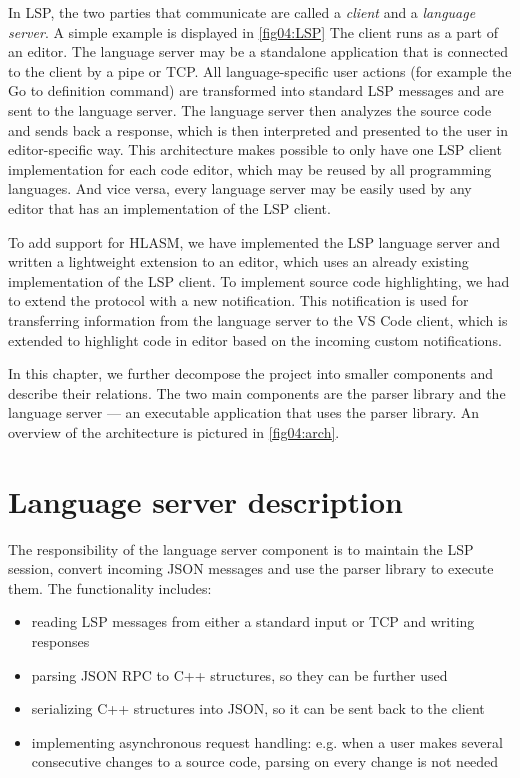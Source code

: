In LSP, the two parties that communicate are called a \emph{client} and a \emph{language server}. A simple example is displayed in \cref{fig04:LSP} The client runs as a part of an editor. The language server may be a standalone application that is connected to the client by a pipe or TCP. All language-specific user actions (for example the Go to definition command) are transformed into standard LSP messages and are sent to the language server. The language server then analyzes the source code and sends back a response, which is then interpreted and presented to the user in editor-specific way. This architecture makes possible to only have one LSP client implementation for each code editor, which may be reused by all programming languages. And vice versa, every language server may be easily used by any editor that has an implementation of the LSP client.

To add support for HLASM, we have implemented the LSP language server and written a lightweight extension to an editor, which uses an already existing implementation of the LSP client. To implement source code highlighting, we had to extend the protocol with a new notification. This notification is used for transferring information from the language server to the VS Code client, which is extended to highlight code in editor based on the incoming custom notifications.

In this chapter, we further decompose the project into smaller components and describe their relations. The two main components are the parser library and the language server --- an executable application that uses the parser library. An overview of the architecture is pictured in \cref{fig04:arch}.

\section{Language server description}

The responsibility of the language server component is to maintain the LSP session, convert incoming JSON messages and use the parser library to execute them. The functionality includes:
\begin{itemize}
    \item reading LSP messages from either a standard input or TCP and writing responses
    \item parsing JSON RPC to C++ structures, so they can be further used
    \item serializing C++ structures into JSON, so it can be sent back to the client
    \item implementing asynchronous request handling: e.g. when a user makes several consecutive changes to a source code, parsing on every change is not needed
\end{itemize}

